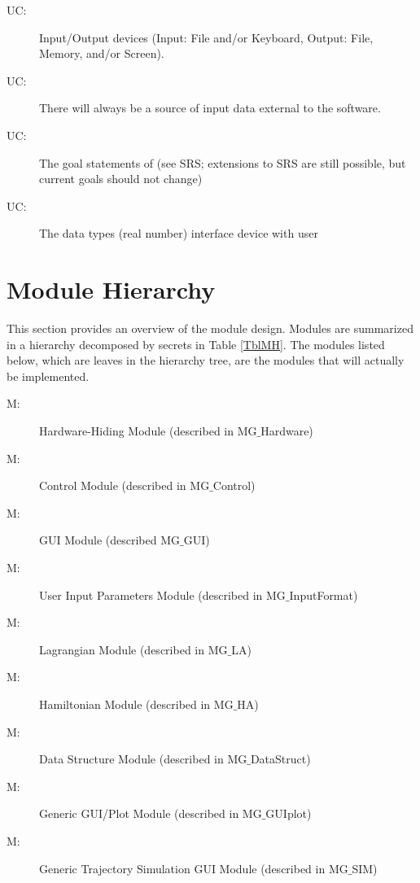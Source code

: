 \documentclass[12pt, titlepage]{article}
\newcounter{ucnum}
\newcommand{\uctheucnum}{UC\theucnum}
\newcounter{mnum}
\newcommand{\mthemnum}{M\themnum}
\begin{document}
\begin{description}
\item[ \uctheucnum \label{ucIO}:] Input/Output devices
  (Input: File and/or Keyboard, Output: File, Memory, and/or Screen).
\item[ \uctheucnum \label{ucInput}:] There will always be
  a source of input data external to the software. 
\item[ \uctheucnum \label{ucGoal}:] The goal statements 
 of \progname (see SRS; extensions to SRS are still possible, but current goals
 should not change)
\item[ \uctheucnum \label{ucData}:] The data types 
(real number) interface device with user
\end{description}

\section{Module Hierarchy} \label{SecMH}

This section provides an overview of the module design. Modules are summarized
in a hierarchy decomposed by secrets in Table \ref{TblMH}. The modules listed
below, which are leaves in the hierarchy tree, are the modules that will
actually be implemented.

\begin{description}
\item [ \mthemnum \label{mHH}:] Hardware-Hiding Module 
(described in MG$\_$Hardware)
\item [ \mthemnum \label{mHH}:] \progname Control Module 
(described in MG$\_$Control)
\item [ \mthemnum \label{mHH}:] \progname GUI Module 
(described MG$\_$GUI)
\item [ \mthemnum \label{mHH}:] User Input Parameters 
Module (described in MG$\_$InputFormat)
\item [ \mthemnum \label{mHH}:] Lagrangian Module 
(described in MG$\_$LA)
\item [ \mthemnum \label{mHH}:] Hamiltonian Module 
(described in MG$\_$HA)
\item [ \mthemnum \label{mHH}:] Data Structure Module 
(described in MG$\_$DataStruct)
\item [ \mthemnum \label{mHH}:] Generic GUI/Plot Module 
(described in MG$\_$GUIplot)
\item [ \mthemnum \label{mHH}:] Generic Trajectory 
Simulation GUI Module (described in MG$\_$SIM)
\end{description}
\end{document}

